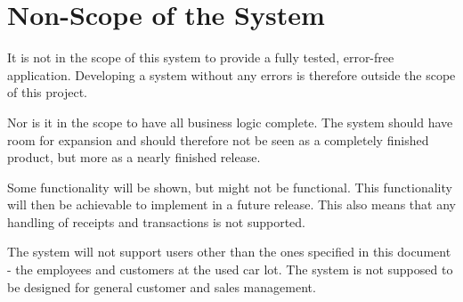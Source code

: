 \section{Non-Scope of the System}
It is not in the scope of this system to provide a fully tested, error-free application. Developing a system without any errors is therefore outside the scope of this project. 

Nor is it in the scope to have all business logic complete. The system should have room for expansion and  should therefore not be seen as a completely finished product, but more as a nearly finished release. 

Some functionality will be shown, but might not be functional. This functionality will then be achievable to implement in a future release. This also means that any handling of receipts and transactions is not supported.

The system will not support users other than the ones specified in this document - the employees and customers at the used car lot. The system is not supposed to be designed for general customer and sales management.